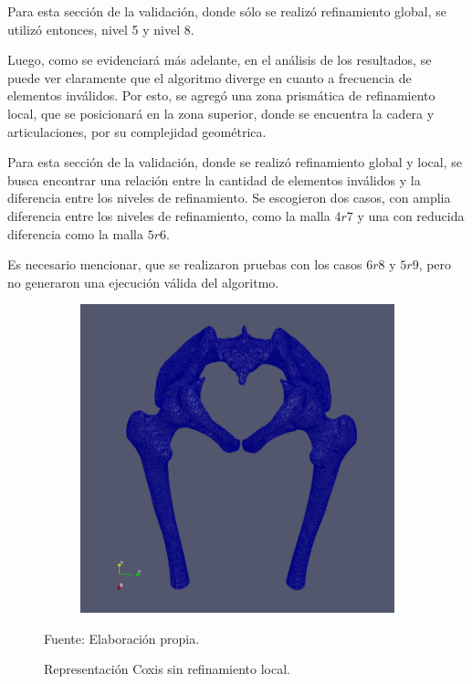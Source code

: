 Para esta sección de la validación, donde sólo se realizó refinamiento global, se utilizó entonces, nivel 5 y nivel 8.

Luego, como se evidenciará más adelante, en el análisis de los resultados, se puede ver claramente que el algoritmo diverge en cuanto a frecuencia de elementos inválidos. Por esto, se agregó una zona prismática de refinamiento local, que se posicionará en la zona superior, donde se encuentra la cadera y articulaciones, por su complejidad geométrica.

Para esta sección de la validación, donde se realizó refinamiento global y local, se busca encontrar una relación entre la cantidad de elementos inválidos y la diferencia entre los niveles de refinamiento.
Se escogieron dos casos, con amplia diferencia entre los niveles de refinamiento, como la malla $4r7$ y una con reducida diferencia como la malla $5r6$.

Es necesario mencionar, que se realizaron pruebas con los casos $6r8$ y $5r9$, pero no generaron una ejecución válida del algoritmo.


\begin{figure}[!ht]
    \centering
    \begin{subfigure}[t]{0.8\textwidth}
        \includegraphics[width=1.0\textwidth]{figures/meshes/coxis_8r9_01.png}
    \end{subfigure}
    \caption{ Representación Coxis sin refinamiento local. }
    Fuente: Elaboración propia.
    \label{fig:coxis_8r9_all}
\end{figure}


